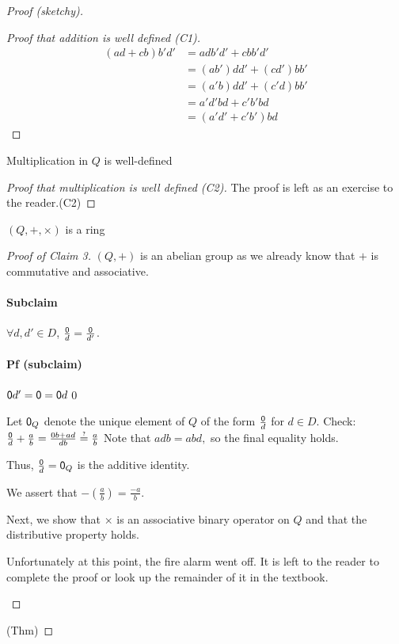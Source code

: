 \documentclass[notes.tex]{subfiles}
\begin{document}
\begin{proof}[Proof (sketchy)]
\begin{proof}[Proof that addition is well defined (C1)]
	\begin{align*}
		(ad+cb)b'd' &= adb'd' + cbb'd'\\
		&= (ab')dd' + (cd')bb'\\
		&= (a'b)dd' + (c'd)bb'\\
		&= a'd'bd + c'b'bd\\
		&=(a'd'+c'b')bd
	\end{align*}
\end{proof}
\begin{claim}[2]
	Multiplication in $Q$ is well-defined
\end{claim}
\begin{proof}[Proof that multiplication is well defined (C2)]
	The proof is left as an exercise to the reader.\qedhere(C2)
\end{proof}

\begin{claim}[3]
	$(Q, +, \times)$ is a ring
\end{claim}
\begin{proof}[Proof of Claim 3]
	$(Q, +)$ is an abelian group as we already know that $+$ is commutative and associative.

	\paragraph{Subclaim} $\forall d, d'\in D$, $\frac{\mathsf{0}}{d} = \frac{\mathsf{0}}{d'}$.
	\paragraph{Pf (subclaim)} $\mathsf{0} d' = \mathsf{0} = \mathsf{0} d$\qed

	Let $\mathsf{0}_Q$ denote the unique element of $Q$ of the form $\frac{\mathsf{0}}{d}$ for $d\in D$.
	Check: $\frac{\zero}{d} + \frac{a}{b} = \frac{0b+ad}{db} \overop=?\frac{a}{b}$ Note that $adb = abd,$ so the final equality holds.

	Thus, $\frac{\mathsf{0}}{d} = \mathsf{0}_Q$ is the additive identity.

	We assert that $-\left(\frac{a}{b}\right) = \frac{-a}{b}$.

	Next, we show that $\times$ is an associative binary operator on $Q$ and that the distributive property holds.

	\begin{fire}
		Unfortunately at this point, the fire alarm went off. It is left to the reader to complete the proof or look up the remainder of it in the textbook.
	\end{fire}
\end{proof}

\qedhere(Thm)
\end{proof}
\end{document}
